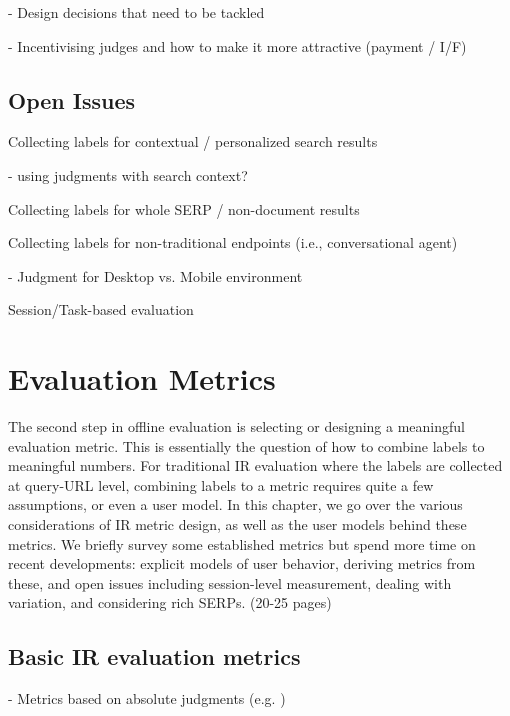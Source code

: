 \documentclass[openany]{now} %
\newcommand{\newpar}{\bigskip\noindent}
\begin{document}
- Design decisions that need to be tackled  \cite{Blanco:2011} \cite{Kazai2012} \cite{Alonso2012} \cite{Alonso:2015} \cite{Scholer:2013} 

- Incentivising judges and how to make it more attractive (payment / I/F)
\cite{Megorskaya2015} \cite{Davtyan2015}  \cite{Rokicki:2014}  \cite{Eickhoff:2012}

\section{Open Issues}

Collecting labels for contextual / personalized search results

- using judgments with search context?

\newpar
Collecting labels for whole SERP / non-document results

\newpar
Collecting labels for non-traditional endpoints (i.e., conversational agent)

- Judgment for Desktop vs. Mobile environment \cite{Verma:2016:CRMD}

\newpar
Session/Task-based evaluation \cite{Moraveji:2011} \cite{Xu:2009}


\chapter{Evaluation Metrics}
\label{c-metrics}

The second step in offline evaluation is selecting or designing a meaningful evaluation metric. This is essentially the question of how to combine labels to meaningful numbers. For traditional IR evaluation where the labels are collected at query-URL level, combining labels to a metric requires quite a few assumptions, or even a user model. In this chapter, we go over the various considerations of IR metric design, as well as the user models behind these metrics. We briefly survey some established metrics but spend more time on recent developments: explicit models of user behavior, deriving metrics from these, and open issues including session-level measurement, dealing with variation, and considering rich SERPs. (20-25 pages)

\section{Basic IR evaluation metrics}

- Metrics based on absolute judgments (e.g. \cite{cooper73selecting})
\end{document}
